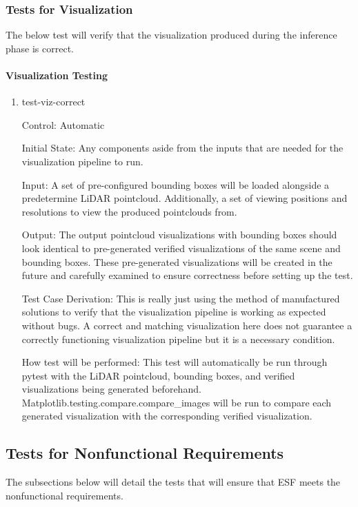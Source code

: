 \documentclass[12pt, titlepage]{article}
\newcommand{\ProjectName}{ESF }
\begin{document}
\subsubsection{Tests for Visualization} \label{Tests for Visualization}

The below test will verify that the visualization produced during the inference phase is correct.

\paragraph{Visualization Testing}
\begin{enumerate}

  \item{test-viz-correct\\}
  
  Control: Automatic
            
  Initial State: Any components aside from the inputs that are needed for the visualization pipeline to run.
            
  Input: A set of pre-configured bounding boxes will be loaded alongside a predetermine LiDAR pointcloud. Additionally, a set of viewing positions and resolutions
  to view the produced pointclouds from.

  Output: The output pointcloud visualizations with bounding boxes should look identical to pre-generated verified visualizations of the same scene and bounding boxes. These
  pre-generated visualizations will be created in the future and carefully examined to ensure correctness before setting up the test.
  
  Test Case Derivation: This is really just using the method of manufactured solutions to verify that the visualization pipeline is working as expected without bugs. A correct
  and matching visualization here does not guarantee a correctly functioning visualization pipeline but it is a necessary condition.
            
  How test will be performed: This test will automatically be run through pytest with the LiDAR pointcloud, bounding boxes, and verified visualizations being generated beforehand.
  Matplotlib.testing.compare.compare\_images will be run to compare each generated visualization with the corresponding verified visualization.
\end{enumerate}

\subsection{Tests for Nonfunctional Requirements}
The subsections below will detail the tests that will ensure that \ProjectName{}meets the nonfunctional requirements.
\end{document}
